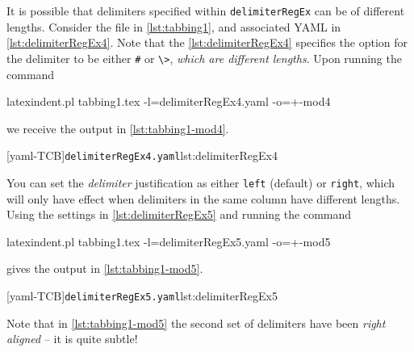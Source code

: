 \documentclass[10pt]{article}
\begin{document}
 \begin{example}
 It is possible that delimiters specified within \texttt{delimiterRegEx} can be of
 different lengths. Consider the file in \cref{lst:tabbing1}, and associated YAML in
 \cref{lst:delimiterRegEx4}. Note that the \cref{lst:delimiterRegEx4} specifies the
 option for the delimiter to be either \lstinline!#! or \lstinline!\>!, \emph{which are
 different lengths}. Upon running the command 

 \begin{commandshell}
latexindent.pl tabbing1.tex -l=delimiterRegEx4.yaml -o=+-mod4
\end{commandshell}

 we receive the output in \cref{lst:tabbing1-mod4}. 

 \begin{cmhtcbraster}[raster columns=3,
   raster left skip=-3.5cm,
   raster right skip=-2cm,
   raster column skip=.03\linewidth]
  [yaml-TCB]{\texttt{delimiterRegEx4.yaml}}{lst:delimiterRegEx4}
 \end{cmhtcbraster}
 \end{example}

 \begin{example}
 You can set the \emph{delimiter} justification as either \texttt{left} (default) or
 \texttt{right}, which will only have effect when delimiters in the same column have
 different lengths. Using the settings in \cref{lst:delimiterRegEx5} and running the
 command  

 \begin{commandshell}
latexindent.pl tabbing1.tex -l=delimiterRegEx5.yaml -o=+-mod5
\end{commandshell}

 gives the output in \cref{lst:tabbing1-mod5}. 

 \begin{cmhtcbraster}
  [yaml-TCB]{\texttt{delimiterRegEx5.yaml}}{lst:delimiterRegEx5}
 \end{cmhtcbraster}

 Note that in \cref{lst:tabbing1-mod5} the second set of delimiters have been \emph{right
 aligned} -- it is quite subtle!
 \end{example}
\end{document}
